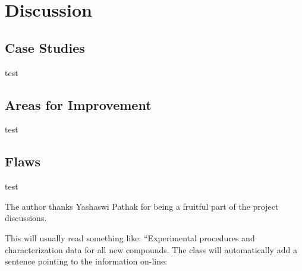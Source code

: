 \documentclass[journal=jacsat,manuscript=article]{achemso}
\begin{document}
\section{Discussion}

\subsection{Case Studies}
test

\subsection{Areas for Improvement}
test

\subsection{Flaws}
test

\begin{acknowledgement}
    The author thanks Yashaswi Pathak for being a fruitful part of the project discussions.

\end{acknowledgement}

\begin{suppinfo}

    This will usually read something like: ``Experimental procedures and
    characterization data for all new compounds. The class will
    automatically add a sentence pointing to the information on-line:

\end{suppinfo}


\end{document}
